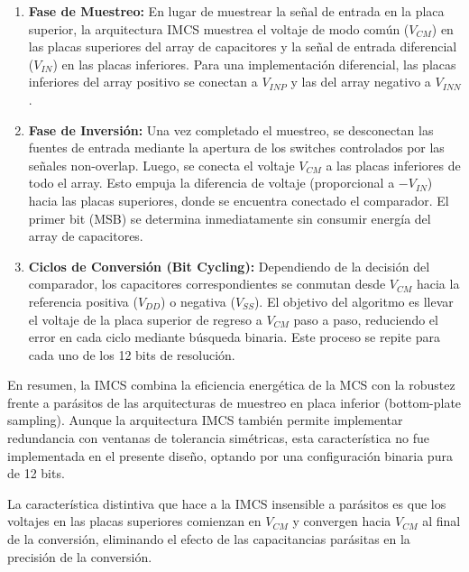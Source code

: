 \documentclass[12pt,a4paper]{report}
\begin{document}
\begin{enumerate}
    \item \textbf{Fase de Muestreo:} En lugar de muestrear la señal de entrada en la placa superior, la arquitectura IMCS muestrea el voltaje de modo común ($V_{CM}$) en las placas superiores del array de capacitores y la señal de entrada diferencial ($V_{IN}$) en las placas inferiores. Para una implementación diferencial, las placas inferiores del array positivo se conectan a $V_{INP}$ y las del array negativo a $V_{INN}$.
    
    \item \textbf{Fase de Inversión:} Una vez completado el muestreo, se desconectan las fuentes de entrada mediante la apertura de los switches controlados por las señales non-overlap. Luego, se conecta el voltaje $V_{CM}$ a las placas inferiores de todo el array. Esto empuja la diferencia de voltaje (proporcional a $-V_{IN}$) hacia las placas superiores, donde se encuentra conectado el comparador. El primer bit (MSB) se determina inmediatamente sin consumir energía del array de capacitores.
    
    \item \textbf{Ciclos de Conversión (Bit Cycling):} Dependiendo de la decisión del comparador, los capacitores correspondientes se conmutan desde $V_{CM}$ hacia la referencia positiva ($V_{DD}$) o negativa ($V_{SS}$). El objetivo del algoritmo es llevar el voltaje de la placa superior de regreso a $V_{CM}$ paso a paso, reduciendo el error en cada ciclo mediante búsqueda binaria. Este proceso se repite para cada uno de los 12 bits de resolución.
\end{enumerate}


En resumen, la IMCS combina la eficiencia energética de la MCS con la robustez frente a parásitos de las arquitecturas de muestreo en placa inferior (bottom-plate sampling). Aunque la arquitectura IMCS también permite implementar redundancia con ventanas de tolerancia simétricas, esta característica no fue implementada en el presente diseño, optando por una configuración binaria pura de 12 bits.

La característica distintiva que hace a la IMCS insensible a parásitos es que los voltajes en las placas superiores comienzan en $V_{CM}$ y convergen hacia $V_{CM}$ al final de la conversión, eliminando el efecto de las capacitancias parásitas en la precisión de la conversión.
\end{document}
